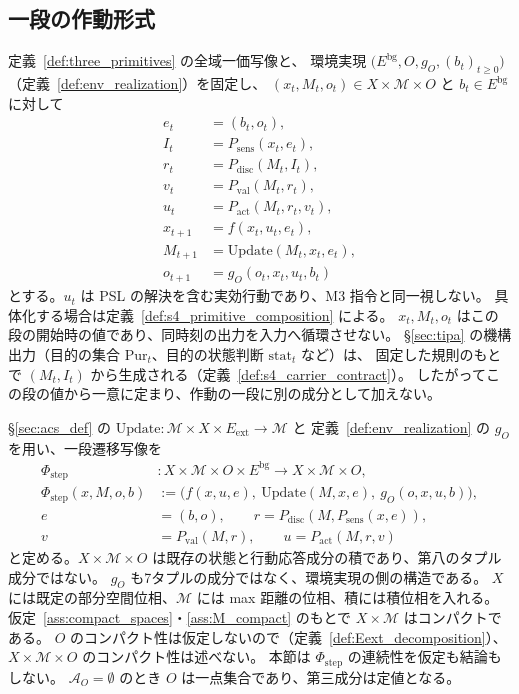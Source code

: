 \subsection{一段の作動形式}
\label{subsec:s5_operation}
\begin{definition}[標準作動の一段]
\label{def:s5_standard_step}
定義~\ref{def:three_primitives} の全域一価写像と、
環境実現 $\bigl(E^{\mathrm{bg}},O,g_O,(b_t)_{t\ge0}\bigr)$（定義~\ref{def:env_realization}）を固定し、
$(x_t,M_t,o_t)\in X\times\mathcal M\times O$ と $b_t\in E^{\mathrm{bg}}$ に対して
\[
\begin{aligned}
e_t&=(b_t,o_t),\\
I_t&=P_{\mathrm{sens}}(x_t,e_t),\\
r_t&=P_{\mathrm{disc}}(M_t,I_t),\\
v_t&=P_{\mathrm{val}}(M_t,r_t),\\
u_t&=P_{\mathrm{act}}(M_t,r_t,v_t),\\
x_{t+1}&=f(x_t,u_t,e_t),\\
M_{t+1}&=\mathrm{Update}(M_t,x_t,e_t),\\
o_{t+1}&=g_O(o_t,x_t,u_t,b_t)
\end{aligned}
\]
とする。$u_t$ は PSL の解決を含む実効行動であり、M3 指令と同一視しない。
具体化する場合は定義~\ref{def:s4_primitive_composition} による。
$x_t,M_t,o_t$ はこの段の開始時の値であり、同時刻の出力を入力へ循環させない。
\S\ref{sec:tipa} の機構出力（目的の集合 $\mathrm{Pur}_t$、目的の状態判断 $\mathrm{stat}_t$ など）は、
固定した規則のもとで $(M_t,I_t)$ から生成される（定義~\ref{def:s4_carrier_contract}）。
したがってこの段の値から一意に定まり、作動の一段に別の成分として加えない。
\end{definition}

\begin{definition}[Updateの参照と一段遷移写像]
\label{def:update_section5}
\label{def:s5_step_map}
\S\ref{sec:acs_def} の $\mathrm{Update}:\mathcal M\times X\times E_{\mathrm{ext}}\to\mathcal M$ と
定義~\ref{def:env_realization} の $g_O$ を用い、一段遷移写像を
\[
\begin{aligned}
\Phi_{\mathrm{step}} &:X\times\mathcal M\times O\times E^{\mathrm{bg}}\to X\times\mathcal M\times O,\\
\Phi_{\mathrm{step}}(x,M,o,b)&:=
\bigl(f(x,u,e),\ \mathrm{Update}(M,x,e),\ g_O(o,x,u,b)\bigr),\\
e&=(b,o),\qquad r=P_{\mathrm{disc}}(M,P_{\mathrm{sens}}(x,e)),\\
v&=P_{\mathrm{val}}(M,r),\qquad u=P_{\mathrm{act}}(M,r,v)
\end{aligned}
\]
と定める。$X\times\mathcal M\times O$ は既存の状態と行動応答成分の積であり、第八のタプル成分ではない。
$g_O$ も7タプルの成分ではなく、環境実現の側の構造である。
$X$ には既定の部分空間位相、$\mathcal M$ には max 距離の位相、積には積位相を入れる。
仮定~\ref{ass:compact_spaces}・\ref{ass:M_compact} のもとで $X\times\mathcal M$ はコンパクトである。
$O$ のコンパクト性は仮定しないので（定義~\ref{def:Eext_decomposition}）、
$X\times\mathcal M\times O$ のコンパクト性は述べない。
本節は $\Phi_{\mathrm{step}}$ の連続性を仮定も結論もしない。
$\mathcal A_O=\emptyset$ のとき $O$ は一点集合であり、第三成分は定値となる。
\end{definition}

